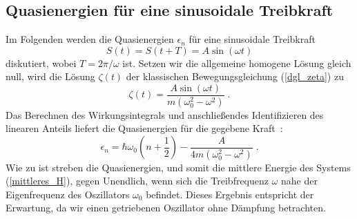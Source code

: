       \subsection{Quasienergien für eine sinusoidale Treibkraft}
      \label{epsilon_sinuskraft}
        Im Folgenden werden die Quasienergien $\epsilon_n$ für eine sinusoidale Treibkraft %
        \begin{equation}
          S(t) = S(t+T) = A\sin(\omega t)
        \end{equation}
        diskutiert, wobei $T=2\pi / \omega$ ist.
        Setzen wir die allgemeine homogene Lösung gleich null, wird die Lösung $\zeta(t)$ der klassischen Bewegungsgleichung (\ref{dgl_zeta}) zu~\cite{mads}
        \begin{equation}
          \zeta(t) = \frac{A\sin(\omega t)}{m(\omega_0^2 - \omega^2)} \;
          \label{zeta_sinuskraft}.
        \end{equation}
        Das Berechnen des Wirkungsintegrals und anschließendes Identifizieren des linearen Anteils liefert die Quasienergien für die gegebene Kraft~\cite{mads}:
        \begin{equation}
          \epsilon_n  = \hbar \omega_0\left(n+\frac{1}{2}\right) - \frac{A}{4m(\omega_0^2-\omega^2)} \;.
        \end{equation}
        Wie zu ist streben die Quasienergien, und somit die mittlere Energie des Systems (\ref{mittleres_H}), gegen Unendlich, wenn sich die Treibfrequenz $\omega$ nahe der Eigenfrequenz des Oszillators $\omega_0 $ befindet.
        Dieses Ergebnis entspricht der Erwartung, da wir einen getriebenen Oszillator ohne Dämpfung betrachten.


